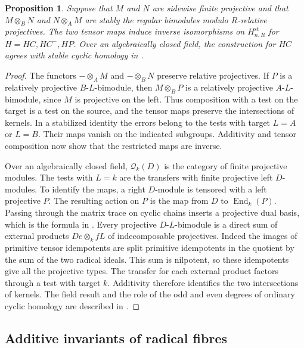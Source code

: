 \documentclass[12pt,a4paper,english,reqno]{amsart}
\numberwithin{equation}{section}
\theoremstyle{plain}
\newtheorem{proposition}[theorem]{Proposition}
\theoremstyle{definition}
\begin{document}
\begin{proposition}\label{prop:relative-stable-cyclic}
Suppose that $M$ and $N$ are sidewise finite projective and
that $M\otimes_BN$ and $N\otimes_AM$ are stably the regular
bimodules modulo $R$-relative projectives. The two tensor
maps induce inverse isomorphisms on $H^{\mathrm{st}}_{n,R}$
for $H=HC,HC^-,HP$. Over an algebraically closed field,
the construction for $HC$ agrees with stable cyclic
homology in \cite[Definition~9.7]{KoenigLiuZhou2012}.
\end{proposition}

\begin{proof}
The functors $-\otimes_A M$ and $-\otimes_B N$ preserve
relative projectives. If $P$ is a relatively projective
$B$-$L$-bimodule, then $M\otimes_B P$ is a relatively projective
$A$-$L$-bimodule, since $M$ is projective on the left. Thus
composition with a test on the target is a test on the
source, and the tensor maps preserve the intersections of
kernels. In a stabilized identity the errors belong to the
tests with target $L=A$ or $L=B$. Their maps vanish on the
indicated subgroups. Additivity and tensor composition now
show that the restricted maps are inverse.

Over an algebraically closed field, $\mathcal Q_k(D)$ is the
category of finite projective modules. The tests with $L=k$
are the transfers with finite projective left $D$-modules.
To identify the maps, a right $D$-module is tensored with
a left projective $P$. The resulting action on $P$ is the map
from $D$ to $\operatorname{End}_k(P)$. Passing through the matrix
trace on cyclic chains inserts a projective dual basis, which
is the formula in \cite[Section~9]{KoenigLiuZhou2012}.
Every projective $D$-$L$-bimodule is a direct sum
of external products $De\otimes_k fL$ of indecomposable
projectives. Indeed the images of primitive tensor idempotents
are split primitive idempotents in the quotient by the sum
of the two radical ideals. This sum is nilpotent, so these
idempotents give all the projective types. The transfer for
each external product factors through a test with target $k$.
Additivity therefore identifies the two intersections of
kernels. The field result and the role of the odd and even
degrees of ordinary cyclic homology are described in
\cite[Theorems~9.6 and~9.9 and Remark~9.10]{KoenigLiuZhou2012}.
\end{proof}

\subsection{Additive invariants of radical fibres}
\label{subsec:radical-additive}
\end{document}
